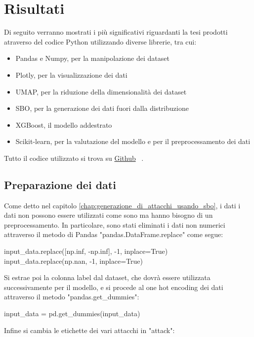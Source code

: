 \chapter{Risultati}
\label{chap:risultati}

Di seguito verranno mostrati i più significativi riguardanti la tesi prodotti atraverso del codice Python utilizzando diverse librerie, tra cui:

\begin{itemize}
    \item Pandas e Numpy, per la manipolazione dei dataset
    \item Plotly, per la visualizzazione dei dati
    \item UMAP, per la riduzione della dimensionalità dei dataset 
    \item SBO, per la generazione dei dati fuori dalla distribuzione
    \item XGBoost, il modello addestrato
    \item Scikit-learn, per la valutazione del modello e per il preprocessamento dei dati
\end{itemize}

Tutto il codice utilizzato si trova su \href{https://github.com/guglielmobartelloni/thesis-utils}{Github}~\cite{github} .

\section{Preparazione dei dati}

Come detto nel capitolo \ref{chap:generazione_di_attacchi_usando_sbo}, i dati i dati non possono essere utilizzati come sono ma hanno bisogno di un preprocessamento. In particolare, sono stati eliminati i dati non numerici attraverso il metodo di Pandas "pandas.DataFrame.replace" come segue:


\begin{python}
input_data.replace([np.inf, -np.inf], -1, inplace=True)
input_data.replace(np.nan, -1, inplace=True)
\end{python}

Si estrae poi la colonna label dal dataset, che dovrà essere utilizzata successivamente per il modello, e si procede al one hot encoding dei dati attraverso il metodo "pandas.get\_dummies":

\begin{python}
input_data = pd.get_dummies(input_data)
\end{python}

Infine si cambia le etichette dei vari attacchi in "attack":

